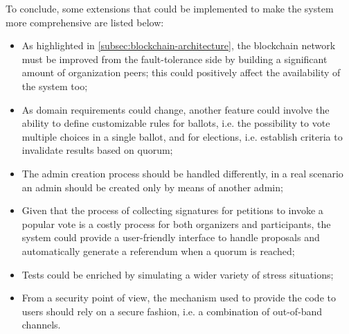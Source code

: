 \documentclass{scrartcl}
\begin{document}
To conclude, some extensions that could be implemented to make the system more comprehensive are listed below:
\begin{itemize}
    \item As highlighted in \ref{subsec:blockchain-architecture}, the blockchain network must be improved from the fault-tolerance side by building a significant amount of organization peers; this could positively affect the availability of the system too;
    \item As domain requirements could change, another feature could involve the ability to define customizable rules for ballots, i.e. the possibility to vote multiple choices in a single ballot, and for elections, i.e. establish criteria to invalidate results based on quorum;
    \item The admin creation process should be handled differently, in a real scenario an admin should be created only by means of another admin;
    \item Given that the process of collecting signatures for petitions to invoke a popular vote is a costly process for both organizers and participants, the system could provide a user-friendly interface to handle proposals and automatically generate a referendum when a quorum is reached;
    \item Tests could be enriched by simulating a wider variety of stress situations;
    \item From a security point of view, the mechanism used to provide the code to users should rely on a secure fashion, i.e. a combination of out-of-band channels.
\end{itemize}

\nocite{*} %


\end{document}
